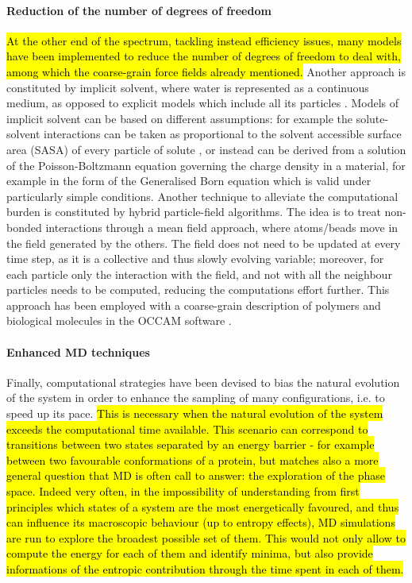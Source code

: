 \paragraph{Reduction of the number of degrees of freedom}
\hl{At the other end of the spectrum, tackling instead efficiency issues, many models have been implemented to reduce the number of degrees of freedom to deal with, among which the coarse-grain force fields already mentioned.}
%
Another approach is constituted by implicit solvent, where water is represented as a continuous medium, as opposed to explicit models which include all its particles \cite{Kleinjung2014}.
%
Models of implicit solvent can be based on different assumptions: for example the solute-solvent interactions can be taken as proportional to the solvent accessible surface area (SASA) of every particle of solute \cite{Fraternali1996,Kleinjung2003,Kleinjung2012,Fornili2012}, or instead can be derived from a solution of the Poisson-Boltzmann equation governing the charge density in a material, for example in the form of the Generalised Born equation \cite{Zhu2005} which is valid under particularly simple conditions.
%
Another technique to alleviate the computational burden is constituted by hybrid particle-field algorithms. The idea is to treat non-bonded interactions through a mean field approach, where atoms/beads move in the field generated by the others. The field does not need to be updated at every time step, as it is a collective and thus slowly evolving variable; moreover, for each particle only the interaction with the field, and not with all the neighbour particles needs to be computed, reducing the computations effort further. This approach has been employed with a coarse-grain description of polymers and biological molecules in the OCCAM software \cite{Milano2009}.

\paragraph{Enhanced MD techniques}
Finally, computational strategies have been devised to bias the natural evolution of the system in order to enhance the sampling of many configurations, i.e. to speed up its pace.
%
\hl{This is necessary when the natural evolution of the system exceeds the computational time available. This scenario can correspond to transitions between two states separated by an energy barrier - for example between two favourable conformations of a protein, but matches also a more general question that MD is often call to answer: the exploration of the phase space. Indeed very often, in the impossibility of understanding from first principles which states of a system are the most energetically favoured, and thus can influence its macroscopic behaviour (up to entropy effects), MD simulations are run to explore the broadest possible set of them. This would not only allow to compute the energy for each of them and identify minima, but also provide informations of the entropic contribution through the time spent in each of them.}

